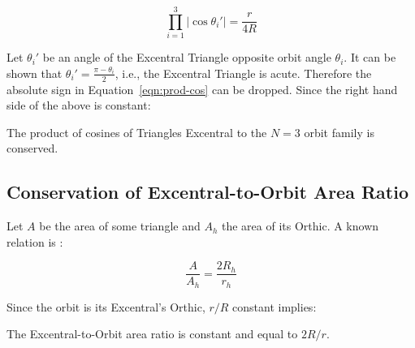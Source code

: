 \begin{equation}
\prod_{i=1}^{3}{|\cos\theta_i'|}=\frac{r}{4R}
\label{eqn:prod-cos}
\end{equation}

Let $\theta_i'$ be an angle of the Excentral Triangle opposite orbit angle $\theta_i$. It can be shown that $\theta_i'=\frac{\pi-\theta_i}{2}$, i.e., the Excentral Triangle is acute. Therefore the absolute sign in Equation~\ref{eqn:prod-cos} can be dropped. Since the right hand side of the above is constant:

\begin{corollary}
\label{cor9}
The product of cosines of Triangles Excentral to the $N=3$ orbit family is conserved.
\end{corollary}

\subsection{Conservation of Excentral-to-Orbit Area Ratio}

Let $A$ be the area of some triangle and $A_h$ the area of its Orthic. A known relation is \cite{johnson29}:

\begin{equation}
\frac{A}{A_h}=\frac{2R_h}{r_h}   
\end{equation}

Since the orbit is its Excentral's Orthic, $r/R$ constant implies:

\begin{corollary}
\label{cor10}
The Excentral-to-Orbit area ratio is constant and equal to $2R/r$.
\end{corollary}
